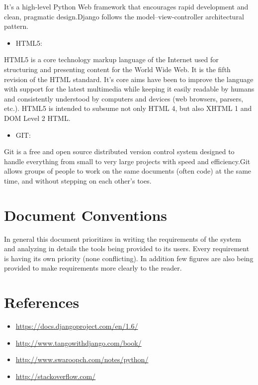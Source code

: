 \documentclass[letterpaper,10pt,english]{sphinxmanual}
\begin{document}
It's a high-level Python Web framework that encourages rapid development and clean, pragmatic design.Django follows the model–view-controller architectural pattern.
\begin{itemize}
\item {} 
HTML5:

\end{itemize}

HTML5 is a core technology markup language of the Internet used for structuring and presenting content for the World Wide Web. It is the fifth revision of the HTML standard. It's core aims have been to improve the language with support for the latest multimedia while keeping it easily readable by humans and consistently understood by computers and devices (web browsers, parsers, etc.). HTML5 is intended to subsume not only HTML 4, but also XHTML 1 and DOM Level 2 HTML.
\begin{itemize}
\item {} 
GIT:

\end{itemize}

Git is a free and open source distributed version control system designed to handle everything from small to very large projects with speed and efficiency.Git allows groups of people to work on the same documents (often code) at the same time, and without stepping on each other's toes.


\section{Document Conventions}
\label{unifieddoc:document-conventions}
In general this document prioritizes in writing the requirements of the system and analyzing in details the tools being provided to its users. Every requirement is having its own priority (none conflicting). In addition few figures are also being provided to make requirements more clearly to the reader.


\section{References}
\label{unifieddoc:references}\begin{itemize}
\item {} 
\href{https://docs.djangoproject.com/en/1.6/}{https://docs.djangoproject.com/en/1.6/}

\item {} 
\href{http://www.tangowithdjango.com/book/}{http://www.tangowithdjango.com/book/}

\item {} 
\href{http://www.swaroopch.com/notes/python/}{http://www.swaroopch.com/notes/python/}

\item {} 
\href{http://stackoverflow.com/}{http://stackoverflow.com/}

\end{itemize}
\end{document}
